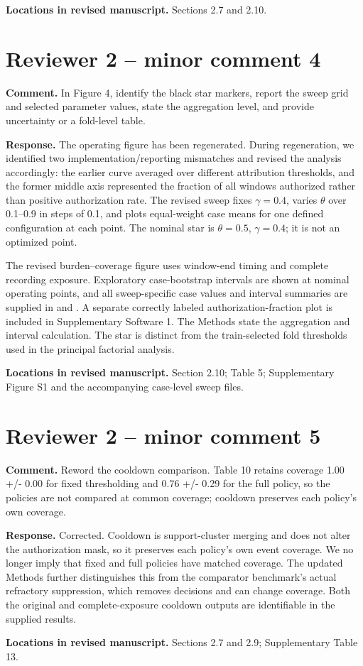 \documentclass[11pt,a4paper]{article}
\begin{document}
\textbf{Locations in revised manuscript.} Sections 2.7 and 2.10.

\section*{Reviewer 2 -- minor comment 4}

\textbf{Comment.} In Figure 4, identify the black star markers, report the sweep grid and selected parameter values, state the aggregation level, and provide uncertainty or a fold-level table.

\textbf{Response.} The operating figure has been regenerated. During regeneration, we identified two implementation/reporting mismatches and revised the analysis accordingly: the earlier curve averaged over different attribution thresholds, and the former middle axis represented the fraction of all windows authorized rather than positive authorization rate. The revised sweep fixes $\gamma=0.4$, varies $\theta$ over 0.1--0.9 in steps of 0.1, and plots equal-weight case means for one defined configuration at each point. The nominal star is $\theta=0.5$, $\gamma=0.4$; it is not an optimized point.

The revised burden--coverage figure uses window-end timing and complete recording exposure. Exploratory case-bootstrap intervals are shown at nominal operating points, and all sweep-specific case values and interval summaries are supplied in  and . A separate correctly labeled authorization-fraction plot is included in Supplementary Software 1. The Methods state the aggregation and interval calculation. The star is distinct from the train-selected fold thresholds used in the principal factorial analysis.

\textbf{Locations in revised manuscript.} Section 2.10; Table 5; Supplementary Figure S1 and the accompanying case-level sweep files.

\section*{Reviewer 2 -- minor comment 5}

\textbf{Comment.} Reword the cooldown comparison. Table 10 retains coverage 1.00 +/- 0.00 for fixed thresholding and 0.76 +/- 0.29 for the full policy, so the policies are not compared at common coverage; cooldown preserves each policy's own coverage.

\textbf{Response.} Corrected. Cooldown is support-cluster merging and does not alter the authorization mask, so it preserves each policy's own event coverage. We no longer imply that fixed and full policies have matched coverage. The updated Methods further distinguishes this from the comparator benchmark's actual refractory suppression, which removes decisions and can change coverage. Both the original and complete-exposure cooldown outputs are identifiable in the supplied results.

\textbf{Locations in revised manuscript.} Sections 2.7 and 2.9; Supplementary Table 13.
\end{document}
